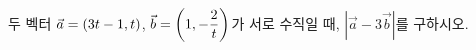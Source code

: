 두 벡터 $\vec{a}=(3t-1{,}\mkern3mu\mathopen{}t)$, $\vec{b}=\left(1{,}\mkern3mu\mathopen{}-\dfrac{2}{t}\right)$가 서로 수직일 때, $|\vec{a}-3\vec{b}|$를 구하시오.
